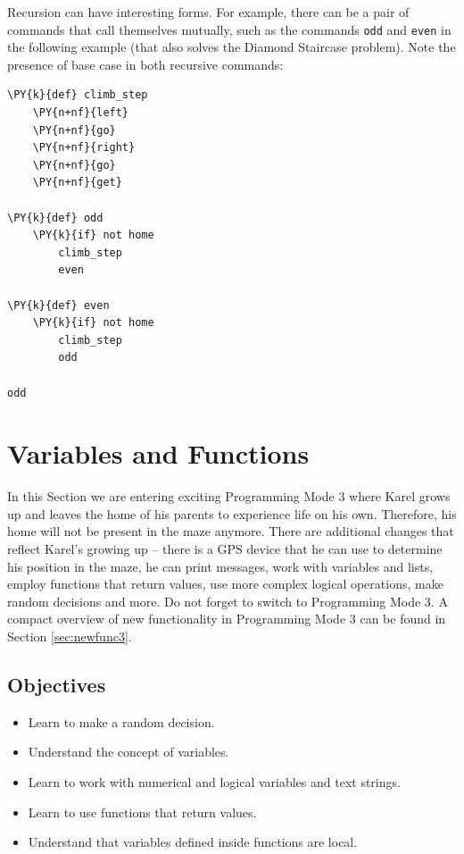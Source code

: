 Recursion can have interesting forms. For example, there can be a pair of commands
that call themselves mutually, such as the commands {\tt odd} and 
{\tt even} in the following example (that also solves the Diamond Staircase
problem). Note the presence of base case in both recursive commands:\\
 
\begin{bbox}
\begin{Verbatim}[commandchars=\\\{\}]
\PY{k}{def} climb_step
    \PY{n+nf}{left}
    \PY{n+nf}{go}
    \PY{n+nf}{right}
    \PY{n+nf}{go}
    \PY{n+nf}{get} 

\PY{k}{def} odd
    \PY{k}{if} not home
        climb_step
        even

\PY{k}{def} even
    \PY{k}{if} not home
        climb_step
        odd
    
odd
\end{Verbatim}
\end{bbox}


\section{Variables and Functions} \label{sec:var}

In this Section we are entering exciting Programming Mode 3 where Karel grows up and leaves the 
home of his parents to experience life on his own. Therefore, his home will not be 
present in the maze anymore. There are additional changes
that reflect Karel's growing up -- there is a GPS 
device that he can use to determine his position in the maze, he can print messages, 
work with variables and lists, employ functions that return values, use more complex 
logical operations, make random 
decisions and more. Do not forget to switch to 
Programming Mode 3. A compact overview of new functionality in Programming Mode 3 can be found 
in Section \ref{sec:newfunc3}.

\subsection[\ \ Objectives]{Objectives} 
 
\begin{itemize}
\item Learn to make a random decision.
\item Understand the concept of variables.
\item Learn to work with numerical and logical variables and text strings.
\item Learn to use functions that return values. 
\item Understand that variables defined inside functions are local. 
\end{itemize}

